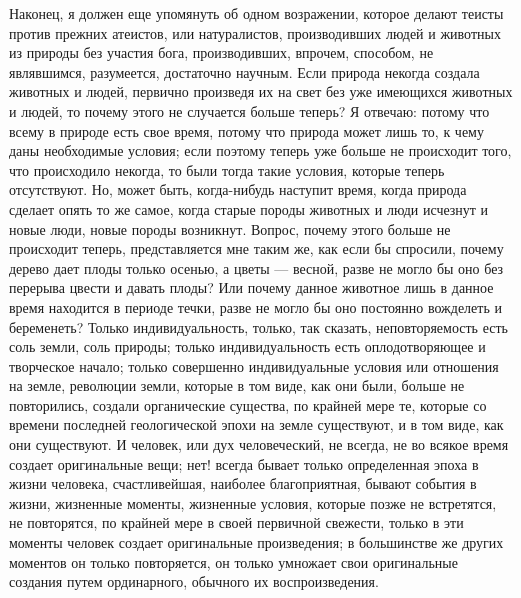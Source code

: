\documentclass[12pt]{article}
\begin{document}
Наконец, я должен еще упомянуть об одном возражении, которое делают теисты против прежних атеистов, или натуралистов, производивших людей и животных из природы без участия бога, производивших, впрочем, способом, не являвшимся, разумеется, достаточно научным. Если природа некогда создала животных и людей, первично произведя их на свет без уже имеющихся животных и людей, то почему этого не случается больше теперь? Я отвечаю: потому что всему в природе есть свое время, потому что природа может лишь то, к чему даны необходимые условия; если поэтому теперь уже больше не происходит того, что происходило некогда, то были тогда такие условия, которые теперь отсутствуют. Но, может быть, когда-нибудь наступит время, когда природа сделает опять то же самое, когда старые породы животных и люди исчезнут и новые люди, новые породы возникнут. Вопрос, почему этого больше не происходит теперь, представляется мне таким же, как если бы спросили, почему дерево дает плоды только осенью, а цветы --- весной, разве не могло бы оно без перерыва цвести и давать плоды? Или почему данное животное лишь в данное время находится в периоде течки, разве не могло бы оно постоянно вожделеть и беременеть? Только индивидуальность, только, так сказать, неповторяемость есть соль земли, соль природы; только индивидуальность есть оплодотворяющее и творческое начало; только совершенно индивидуальные условия или отношения на земле, революции земли, которые в том виде, как они были, больше не повторились, создали органические существа, по крайней мере те, которые со времени последней геологической эпохи на земле существуют, и в том виде, как они существуют. И человек, или дух человеческий, не всегда, не во всякое время создает оригинальные вещи; нет! всегда бывает только определенная эпоха в жизни человека, счастливейшая, наиболее благоприятная, бывают события в жизни, жизненные моменты, жизненные условия, которые позже не встретятся, не повторятся, по крайней мере в своей первичной свежести, только в эти моменты человек создает оригинальные произведения; в большинстве же других моментов он только повторяется, он только умножает свои оригинальные создания путем ординарного, обычного их воспроизведения. 
\end{document}

